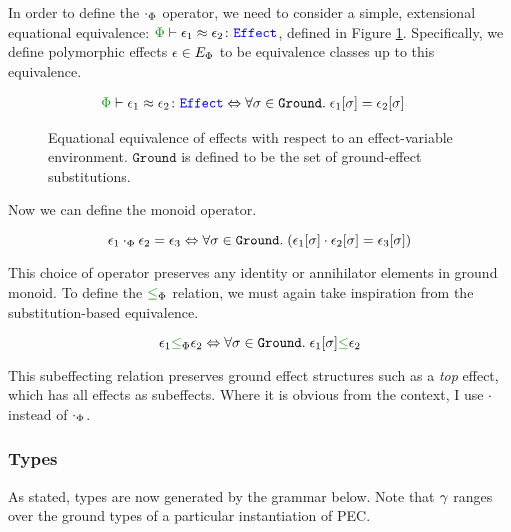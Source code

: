 \documentclass{Report}
\newcommand\groundEffects[0]{\texttt{Ground}}
\begin{document}
In order to define the $\dotp$ operator, we need to consider a simple, extensional equational equivalence: $\zpberelation{\e_1}{\e_2}{\effect}$, defined in Figure \ref{EffectEquivalence}. Specifically, we define polymorphic effects $\e\in E_\P$ to be equivalence classes up to this equivalence.

\begin{figure}[H]
    \centering
    \begin{framed}
        \begin{align}
            \zpberelation{\e_1}{\e_2}{\effect} & \Leftrightarrow \forall \si\in\groundEffects.\s\e_1\ssi = \e_2\ssi
        \end{align}
    \end{framed}
    
    \caption{Equational equivalence of effects with respect to an effect-variable environment. $\groundEffects$ is defined to be the set of ground-effect substitutions.}
    \label{EffectEquivalence}
\end{figure}
Now we can define the monoid operator. 
\begin{framed}
    \begin{definition}
        $$\e_1\dotp\e_2 = \e_3 \Leftrightarrow \forall \si\in\groundEffects.\s (\e_1\ssi \dot \e_2\ssi = \e_3\ssi)$$ 
    \end{definition}
\end{framed}

This choice of operator preserves any identity or annihilator elements in ground monoid. To define the $\subeffectp$ relation, we must again take inspiration from the substitution-based equivalence. 


\begin{framed}
    
\begin{definition}
    $$\e_1\subeffectp\e_2\Leftrightarrow \forall\si\in\groundEffects.\s\e_1\ssi\subeffect\e_2$$
    
\end{definition}

\end{framed}
This subeffecting relation preserves ground effect structures such as a \textit{top} effect, which has all effects as subeffects. Where it is obvious from the context, I use $\dot$ instead of $\dotp$.


\subsubsection{Types}
As stated, types are now generated by the grammar below. Note that $\g$ ranges over the ground types of a particular instantiation of PEC.
\end{document}
